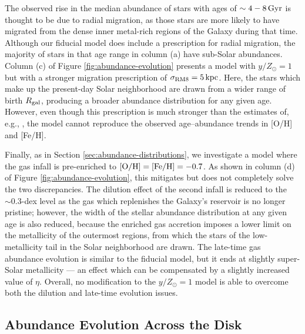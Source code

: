 \documentclass[twocolumn,twocolappendix,linenumbers]{aastex631}
\newcommand{\mathOH}{{\rm [O/H]}}
\newcommand{\mathFeH}{{\rm [Fe/H]}}
\begin{document}
The observed rise in the median abundance of stars with ages of $\sim4-8\,{\rm Gyr}$ is thought to be due to radial migration, as those stars are more likely to have migrated from the dense inner metal-rich regions of the Galaxy during that time. Although our fiducial model does include a prescription for radial migration, the majority of stars in that age range in column (a) have sub-Solar abundances. Column (c) of Figure \ref{fig:abundance-evolution} presents a model with $y/Z_\odot=1$ but with a stronger migration prescription of $\sigma_{\rm RM8}=5\,{\rm kpc}$. Here, the stars which make up the present-day Solar neighborhood are drawn from a wider range of birth $R_{\rm gal}$, producing a broader abundance distribution for any given age. However, even though this prescription is much stronger than the estimates of, e.g., \citet{frankel_measuring_2018}, the model cannot reproduce the observed age--abundance trends in [O/H] and [Fe/H].

Finally, as in Section \ref{sec:abundance-distributions}, we investigate a model where the gas infall is pre-enriched to $\mathOH=\mathFeH=-0.7$. As shown in column (d) of Figure \ref{fig:abundance-evolution}, this mitigates but does not completely solve the two discrepancies. The dilution effect of the second infall is reduced to the $\sim0.3$-dex level as the gas which replenishes the Galaxy's reservoir is no longer pristine; however, the width of the stellar abundance distribution at any given age is also reduced, because the enriched gas accretion imposes a lower limit on the metallicity of the outermost regions, from which the stars of the low-metallicity tail in the Solar neighborhood are drawn. The late-time gas abundance evolution is similar to the fiducial model, but it ends at slightly super-Solar metallicity --- an effect which can be compensated by a slightly increased value of $\eta$. Overall, no modification to the $y/Z_\odot=1$ model is able to overcome both the dilution and late-time evolution issues.

\subsection{Abundance Evolution Across the Disk}
\label{sec:disk-evolution}
\end{document}
